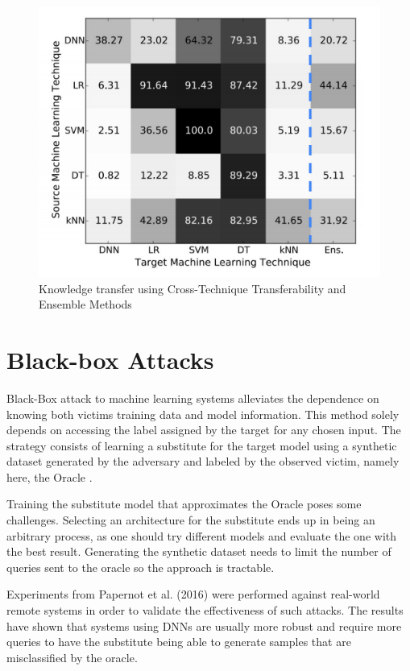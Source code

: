 \begin{figure}[!h]
\centering
	\includegraphics[scale=0.6]{cross.png}
\caption{Knowledge transfer using Cross-Technique Transferability and Ensemble Methods \cite{papernot2016transf}}
\label{fig:cross}
\end{figure}
\section{Black-box Attacks}
Black-Box attack to machine learning systems alleviates the dependence on knowing both victims training data and model information. This method solely depends on accessing the label assigned by the target for any chosen input. The strategy consists of learning a substitute for the target model using a synthetic dataset generated by the adversary and labeled by the observed victim, namely here, the Oracle \cite{papernot2016}.

Training the substitute model that approximates the Oracle poses some challenges. Selecting an architecture for the substitute ends up in being an arbitrary process, as one should try different models and evaluate the one with the best result. Generating the synthetic dataset needs to limit the number of queries sent to the oracle so the approach is tractable. 

Experiments from Papernot et al. (2016) were performed against real-world remote systems in order to validate the effectiveness of such attacks. The results have shown that systems using DNNs are usually more robust and require more queries to have the substitute being able to generate samples that are misclassified by the oracle.

